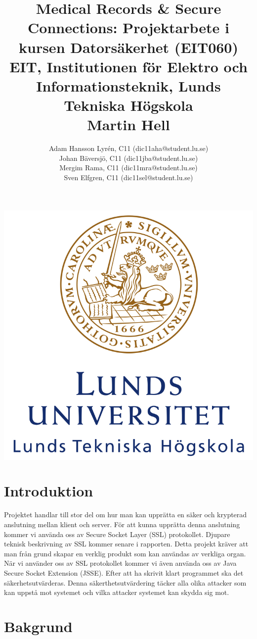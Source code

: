 \documentclass[a4paper]{article}
\title{
	Medical Records \& Secure Connections: Projektarbete i kursen Datorsäkerhet (EIT060)\\
	EIT, Institutionen för Elektro och Informationsteknik, Lunds Tekniska Högskola\\
	Martin Hell}
\author{
Adam Hansson Lyrén, C11 (dic11aha@student.lu.se)\\
Johan Bäversjö, C11 (dic11jba@student.lu.se)\\
Mergim Rama, C11 (dic11mra@student.lu.se)\\
Sven Elfgren, C11 (dic11sel@student.lu.se)\\
}
\begin{document}

\maketitle
\centerline{\includegraphics[scale = 0.6]{LTH.JPG}}
\thispagestyle{empty}
\newpage
\setcounter{page}{1}


\tableofcontents
\newpage

\section{Introduktion}
Projektet handlar till stor del om hur man kan upprätta en säker och krypterad anslutning mellan klient och server. För att kunna upprätta denna anslutning kommer vi använda oss av Secure Socket Layer (SSL) protokollet. Djupare teknisk beskrivning av SSL kommer senare i rapporten. Detta projekt kräver att man från grund skapar en verklig produkt som kan användas av verkliga organ. När vi använder oss av SSL protokollet kommer vi även använda oss av Java Secure Socket Extension (JSSE). Efter att ha skrivit klart programmet ska det säkerhetsutvärderas. Denna säkerthetsutvärdering täcker alla olika attacker som kan uppstå mot systemet och vilka attacker systemet kan skydda sig mot. 


\section{Bakgrund}
\end{document}
